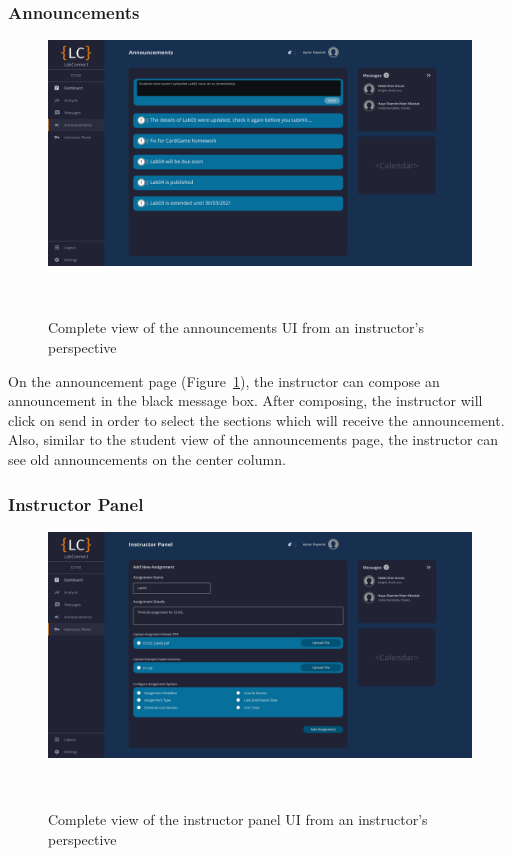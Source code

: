 \documentclass[a4paper, 12pt]{article}
\begin{document}
    \subsubsection{Announcements}

    \begin{figure}[H]
        \centering
        \includegraphics[width=\textwidth]{instructor_announcements}
        \caption{Complete view of the announcements UI from an instructor's perspective}~\label{fig:instructor_announcements_full}
    \end{figure}

    On the announcement page (Figure~\ref{fig:instructor_announcements_full}), the instructor can compose an announcement in the black message box. After composing, the instructor will click on send
    in order to select the sections which will receive the announcement. Also, similar to the student view of the announcements page, the instructor can see old announcements on the center column.



    \pagebreak

    \subsubsection{Instructor Panel}

    \begin{figure}[H]
        \centering
        \includegraphics[width=\textwidth]{instructor_admin_panel}
        \caption{Complete view of the instructor panel UI from an instructor's perspective}~\label{fig:instructor_admin_panel_full}
    \end{figure}
\end{document}
